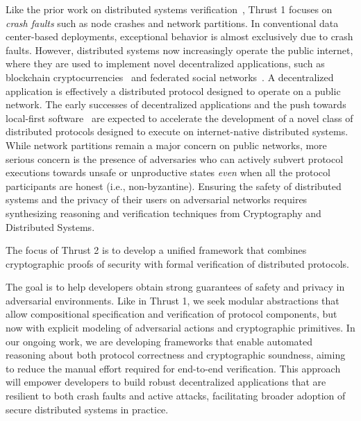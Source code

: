 Like the prior work on distributed systems verification~\cite{verdi,
VerdiRaft, disel-popl18}, Thrust 1 focuses on \emph{crash faults} such as
node crashes and network partitions. In conventional data center-based
deployments, exceptional behavior is almost exclusively due to crash
faults. However, distributed systems now increasingly operate the public
internet, where they are used to implement novel decentralized
applications, such as blockchain
cryptocurrencies~\cite{nakamoto-bitcoin08,buterin-eth14} and federated
social networks~\cite{mastodon,bluesky}. A decentralized application is
effectively a distributed protocol designed to operate on a public network.
The early successes of decentralized applications and the push towards
local-first software~\cite{local-first} are expected to accelerate the
development of a novel class of distributed protocols designed to execute
on internet-native distributed systems. While network partitions remain a
major concern on public networks,  more serious concern is the presence of
adversaries who can actively subvert protocol executions towards unsafe or
unproductive states \emph{even} when all the protocol participants are
honest (i.e., non-byzantine). Ensuring the safety of distributed systems
and the privacy of their users on adversarial networks requires
synthesizing reasoning and verification techniques from Cryptography and
Distributed Systems.
\begin{mdquote}
  The focus of Thrust 2 is to develop a unified framework that combines cryptographic proofs of security with formal verification of distributed protocols. 
\end{mdquote}
\noindent The goal is to help developers obtain strong guarantees of safety
and privacy in adversarial environments. Like in Thrust 1, we seek modular
abstractions that allow compositional specification and verification of
protocol components, but now with explicit modeling of adversarial actions
and cryptographic primitives. In our ongoing work, we are developing
frameworks that enable automated reasoning about both protocol correctness
and cryptographic soundness, aiming to reduce the manual effort required
for end-to-end verification. This approach will empower developers to build
robust decentralized applications that are resilient to both crash faults
and active attacks, facilitating broader adoption of secure distributed
systems in practice.


